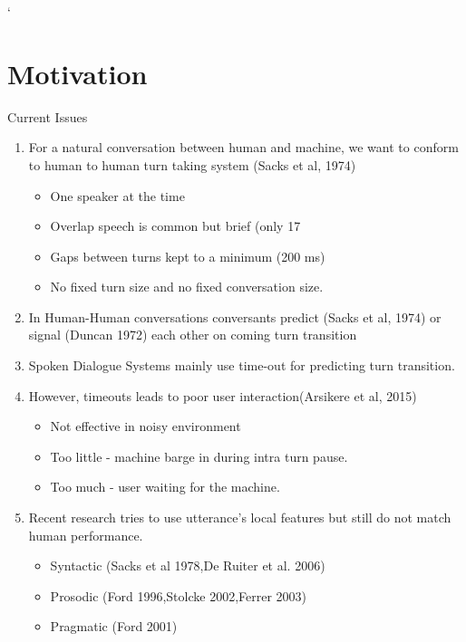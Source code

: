 `%

\section{Motivation}
\frame{\sectionpage}




\begin{frame}{Current Issues}
    \begin{enumerate}
      \item For a natural conversation between human and machine, we want to conform
            to human to human turn taking system (Sacks et al, 1974)
                \begin{itemize}
                    \item One speaker at the time
                    \item Overlap speech is common but brief (only 17%
                    \item Gaps between turns kept to a minimum (200 ms)
                    \item No fixed turn size and no fixed conversation size.
                \end{itemize}
      \item In Human-Human conversations conversants predict (Sacks et al, 1974) or
            signal (Duncan 1972) each other on coming turn transition
      \item Spoken Dialogue Systems mainly use time-out for predicting turn transition.      
      \item {
        However, timeouts leads to poor user interaction(Arsikere et al, 2015)
        \begin{itemize}
            \item Not effective in noisy environment
            \item Too little - machine barge in during intra turn pause.
            \item Too much - user waiting for the machine.
        \end{itemize}
      }
      \item {
        Recent research tries to use utterance's local features but still do not match human performance.
        \begin{itemize}
            \item Syntactic (Sacks et al 1978,De Ruiter et al. 2006)
            \item Prosodic (Ford 1996,Stolcke 2002,Ferrer 2003)
            \item Pragmatic (Ford 2001)
        \end{itemize}
      }
    \end{enumerate}
\end{frame}

